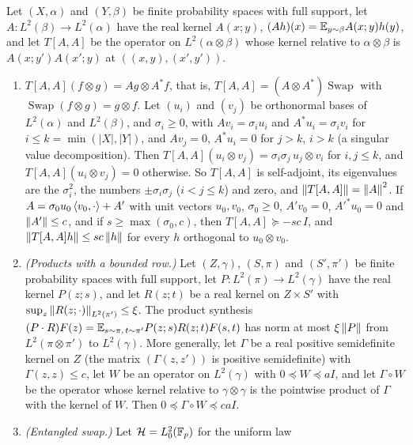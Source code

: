 \begin{lemma}\label{lem:swapped-rectangle}
Let $(X,\alpha)$ and $(Y,\beta)$ be finite probability spaces with full
support, let $A\colon L^2(\beta)\to L^2(\alpha)$ have the real kernel $A(x;y)$,
$(Ah)(x)=\mathbb E_{y\sim\beta}A(x;y)h(y)$, and let $T[A,A]$ be the operator on
$L^2(\alpha\otimes\beta)$ whose kernel relative to $\alpha\otimes\beta$ is
$A(x;y')A(x';y)$ at $((x,y),(x',y'))$.
\begin{enumerate}[label=\textup{(\alph*)}]
\item $T[A,A](f\otimes g)=Ag\otimes A^*f$, that is,
  $T[A,A]=(A\otimes A^*)\operatorname{Swap}$ with
  $\operatorname{Swap}(f\otimes g)=g\otimes f$. Let $(u_i)$ and $(v_j)$ be
  orthonormal bases of $L^2(\alpha)$ and $L^2(\beta)$, and $\sigma_i\ge0$, with
  $Av_i=\sigma_iu_i$ and $A^*u_i=\sigma_iv_i$ for $i\le k=\min(|X|,|Y|)$, and
  $Av_j=0$, $A^*u_i=0$ for $j>k$, $i>k$ (a singular value decomposition). Then
  $T[A,A](u_i\otimes v_j)=\sigma_i\sigma_j\,u_j\otimes v_i$ for $i,j\le k$, and
  $T[A,A](u_i\otimes v_j)=0$ otherwise. So $T[A,A]$ is self-adjoint, its
  eigenvalues are the $\sigma_i^2$, the numbers $\pm\sigma_i\sigma_j$
  ($i<j\le k$) and zero, and $\left\|T[A,A]\right\|=\left\|A\right\|^2$. If
  $A=\sigma_0u_0\left\langle v_0,\cdot\right\rangle+A'$ with unit vectors $u_0,v_0$, $\sigma_0\ge0$,
  $A'v_0=0$, $A'^*u_0=0$ and $\left\|A'\right\|\le c$, and if $s\ge\max(\sigma_0,c)$,
  then $T[A,A]\succeq-sc\,I$, and $\left\|T[A,A]h\right\|\le sc\left\|h\right\|$ for every $h$
  orthogonal to $u_0\otimes v_0$.
\item \emph{(Products with a bounded row.)} Let $(Z,\gamma)$, $(S,\pi)$ and
  $(S',\pi')$ be finite probability spaces with full support, let
  $P\colon L^2(\pi)\to L^2(\gamma)$ have the real kernel $P(z;s)$, and let
  $R(z;t)$ be a real kernel on $Z\times S'$ with
  $\sup_z\left\|R(z;\cdot)\right\|_{L^2(\pi')}\le\xi$. The product synthesis
  $(P\cdot R)F(z)=\mathbb E_{s\sim\pi,\,t\sim\pi'}P(z;s)R(z;t)F(s,t)$ has norm at most
  $\xi\left\|P\right\|$ from $L^2(\pi\otimes\pi')$ to $L^2(\gamma)$. More generally, let
  $\Gamma$ be a real positive semidefinite kernel on $Z$ (the matrix
  $(\Gamma(z,z'))$ is positive semidefinite) with $\Gamma(z,z)\le c$, let $W$ be
  an operator on $L^2(\gamma)$ with $0\preceq W\preceq aI$, and let
  $\Gamma\circ W$ be the operator whose kernel relative to $\gamma\otimes\gamma$
  is the pointwise product of $\Gamma$ with the kernel of $W$. Then
  $0\preceq\Gamma\circ W\preceq caI$.
\item \emph{(Entangled swap.)} Let $\mathcal H=L^2_0(\mathbb F_p)$ for the uniform law

\end{enumerate}
\end{lemma}
